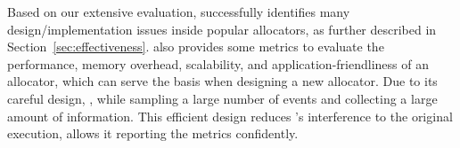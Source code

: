 

Based on our extensive evaluation, \MP{} successfully identifies many design/implementation issues inside popular allocators, as further described in Section~\ref{sec:effectiveness}. \MP{} also provides some metrics to evaluate the performance, memory overhead, scalability, and application-friendliness of an allocator, which can serve the basis when designing a new allocator. Due to its careful design, , while sampling a large number of events and collecting a large amount of information. This efficient design reduces \MP{}'s interference to the original execution, allows it reporting the metrics confidently. 

